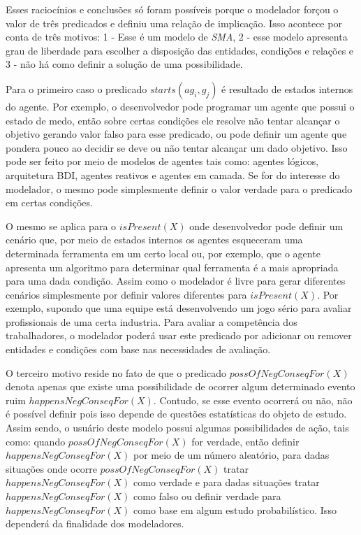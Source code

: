 Esses raciocínios e conclusões só foram possíveis porque o modelador forçou o valor de três predicados e definiu uma relação de implicação. Isso acontece por conta de três motivos: 1 - Esse é um modelo de \textit{SMA}, 2 - esse modelo apresenta grau de liberdade para escolher a disposição das entidades, condições e relações e 3 - não há como definir a solução de uma possibilidade. 

Para o primeiro caso o predicado $starts(ag_i,g_j)$ é resultado de estados internos do agente. Por exemplo, o desenvolvedor pode programar um agente que possui o estado de medo, então sobre certas condições ele resolve não tentar alcançar o objetivo gerando valor falso para esse predicado, ou pode definir um agente que pondera pouco ao decidir se deve ou não tentar alcançar um dado objetivo. Isso pode ser feito por meio de modelos de agentes tais como: agentes lógicos, arquitetura BDI, agentes reativos e agentes em camada. Se for do interesse do modelador, o mesmo pode simplesmente definir o valor verdade para o predicado em certas condições. 

O mesmo se aplica para o $isPresent(X)$ onde desenvolvedor pode definir um cenário que, por meio de estados internos os agentes esqueceram uma determinada ferramenta em um certo local ou, por exemplo, que o agente apresenta um algoritmo para determinar qual ferramenta é a mais apropriada para uma dada condição. Assim como o modelador é livre para gerar diferentes cenários simplesmente por definir valores diferentes para $isPresent(X)$. Por exemplo, supondo que uma equipe está desenvolvendo um jogo sério para avaliar profissionais de uma certa industria. Para avaliar a competência dos trabalhadores, o modelador poderá usar este predicado por adicionar ou remover entidades e condições com base nas necessidades de avaliação.

O terceiro motivo reside no fato de que o predicado $possOfNegConseqFor(X)$ denota apenas que existe uma possibilidade de ocorrer algum determinado evento ruim  $happensNegConseqFor(X)$. Contudo, se esse evento ocorrerá ou não, não é possível definir pois isso depende de questões estatísticas do objeto de estudo. Assim sendo, o usuário deste modelo possui algumas possibilidades de ação, tais como: quando $possOfNegConseqFor(X)$  for verdade, então definir $happensNegConseqFor(X)$ por meio de um número aleatório, para dadas situações onde ocorre $possOfNegConseqFor(X)$ tratar $happensNegConseqFor(X)$ como verdade e para dadas situações tratar $happensNegConseqFor(X)$ como falso ou definir verdade para $happensNegConseqFor(X)$ como base em algum estudo probabilístico. Isso dependerá da finalidade dos modeladores. 